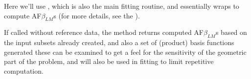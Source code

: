 \documentclass[letterpaper,table,10pt,english]{jupyterBook}
\begin{document}
\sphinxAtStartPar
Here we’ll use , which is also the main fitting routine, and essentially wraps  to compute AF\sphinxhyphen{}\(\beta_{LM}\)s (for more details, see the ).

\sphinxAtStartPar
If called without reference data, the method returns computed AF\sphinxhyphen{}\(\beta_{LM}\)s based on the input subsets already created, and also a set of (product) basis functions generated \sphinxhyphen{} these can be examined to get a feel for the sensitivity of the geometric part of the problem, and will also be used in fitting to limit repetitive computation.
\end{document}
